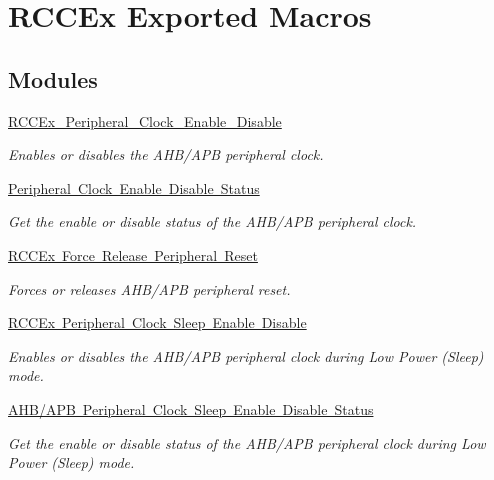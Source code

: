 \hypertarget{group___r_c_c_ex___exported___macros}{}\section{R\+C\+C\+Ex Exported Macros}
\label{group___r_c_c_ex___exported___macros}
\subsection*{Modules}
\begin{DoxyCompactItemize}
\item 
\mbox{\hyperlink{group___r_c_c_ex___peripheral___clock___enable___disable}{R\+C\+C\+Ex\+\_\+\+Peripheral\+\_\+\+Clock\+\_\+\+Enable\+\_\+\+Disable}}
\begin{DoxyCompactList}\small\item\em Enables or disables the A\+H\+B/\+A\+PB peripheral clock. \end{DoxyCompactList}\item 
\mbox{\hyperlink{group___r_c_c_ex___peripheral___clock___enable___disable___status}{Peripheral Clock Enable Disable Status}}
\begin{DoxyCompactList}\small\item\em Get the enable or disable status of the A\+H\+B/\+A\+PB peripheral clock. \end{DoxyCompactList}\item 
\mbox{\hyperlink{group___r_c_c_ex___force___release___peripheral___reset}{R\+C\+C\+Ex Force Release Peripheral Reset}}
\begin{DoxyCompactList}\small\item\em Forces or releases A\+H\+B/\+A\+PB peripheral reset. \end{DoxyCompactList}\item 
\mbox{\hyperlink{group___r_c_c_ex___peripheral___clock___sleep___enable___disable}{R\+C\+C\+Ex Peripheral Clock Sleep Enable Disable}}
\begin{DoxyCompactList}\small\item\em Enables or disables the A\+H\+B/\+A\+PB peripheral clock during Low Power (Sleep) mode. \end{DoxyCompactList}\item 
\mbox{\hyperlink{group___r_c_c___clock___sleep___enable___disable___status}{A\+H\+B/\+A\+P\+B Peripheral Clock Sleep Enable Disable Status}}
\begin{DoxyCompactList}\small\item\em Get the enable or disable status of the A\+H\+B/\+A\+PB peripheral clock during Low Power (Sleep) mode. \end{DoxyCompactList}\end{DoxyCompactItemize}
